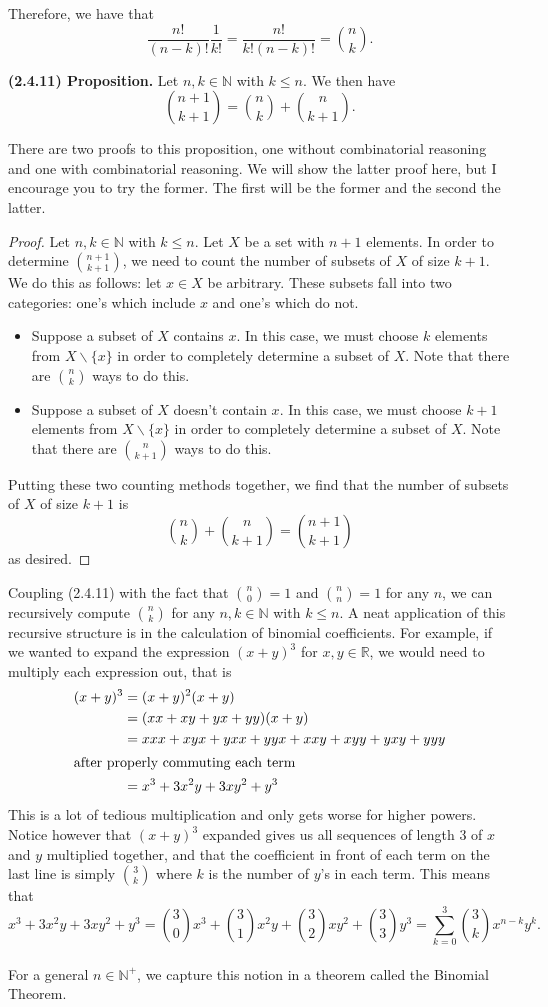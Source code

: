 \documentclass[12pt]{book}
\def\N{{\mathbb{N}}}
\def\R{{\mathbb{R}}}
\def\header #1{\noindent\textbf{#1}}
\begin{document}
Therefore, we have that 
\[\frac{n!}{(n-k)!}\frac{1}{k!}=\frac{n!}{k!(n-k)!}=\binom{n}{k}.\]


\header{(2.4.11) Proposition.} Let $n,k\in\N$ with $k\leq n$. We then have
\[\binom{n+1}{k+1}=\binom{n}{k}+\binom{n}{k+1}.\]

There are two proofs to this proposition, one without combinatorial reasoning and one with combinatorial reasoning. We will show the latter proof here, but I encourage you to try the former. The first will be the former and the second the latter.

\begin{proof}
Let $n,k\in\N$ with $k\leq n$. Let $X$ be a set with $n+1$ elements. In order to determine $\binom{n+1}{k+1}$, we need to count the number of subsets of $X$ of size $k+1$. We do this as follows: let $x\in X$ be arbitrary. These subsets fall into two categories: one's which include $x$ and one's which do not.
\begin{itemize}
\item Suppose a subset of $X$ contains $x$. In this case, we must choose $k$ elements from $X\backslash\{x\}$ in order to completely determine a subset of $X$. Note that there are $\binom{n}{k}$ ways to do this.
\item Suppose a subset of $X$ doesn't contain $x$. In this case, we must choose $k+1$ elements from $X\backslash\{x\}$ in order to completely determine a subset of $X$. Note that there are $\binom{n}{k+1}$ ways to do this.
\end{itemize}
Putting these two counting methods together, we find that the number of subsets of $X$ of size $k+1$ is
\[\binom{n}{k}+\binom{n}{k+1}=\binom{n+1}{k+1}\]
as desired.
\end{proof}

Coupling (2.4.11) with the fact that $\binom{n}{0}=1$ and $\binom{n}{n}=1$ for any $n$, we can recursively compute $\binom{n}{k}$ for any $n,k\in\N$ with $k\leq n$. A neat application of this recursive structure is in the calculation of binomial coefficients. For example, if we wanted to expand the expression $(x+y)^3$ for $x,y\in\R$, we would need to multiply each expression out, that is 
\begin{align*}
	(x+y)^3 & = (x+y)^2(x+y)\\
	 & = (xx+xy+yx+yy)(x+y)\\
	 & = xxx+xyx+yxx+yyx+xxy+xyy+yxy+yyy\\
	 \intertext{after properly commuting each term}
	 & = x^3+3x^2y+3xy^2+y^3
\end{align*}
This is a lot of tedious multiplication and only gets worse for higher powers. Notice however that $(x+y)^3$ expanded gives us all sequences of length $3$ of $x$ and $y$ multiplied together, and that the coefficient in front of each term on the last line is simply $\binom{3}{k}$ where $k$ is the number of $y$'s in each term. This means that
\[x^3+3x^2y+3xy^2+y^3=\binom{3}{0}x^3+\binom{3}{1}x^2y+\binom{3}{2}xy^2+\binom{3}{3}y^3=\sum_{k=0}^3\binom{3}{k}x^{n-k}y^k.\] \\
For a general $n\in\N^+$, we capture this notion in a theorem called the Binomial Theorem.\\
\end{document}

